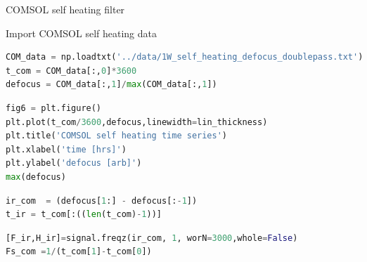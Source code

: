 
\noindent COMSOL self heating filter

\noindent Import COMSOL self heating data

\begin{spacing}{1.2} \begin{lstlisting}[frame=single,language=Python]
COM_data = np.loadtxt('../data/1W_self_heating_defocus_doublepass.txt')
t_com = COM_data[:,0]*3600
defocus = COM_data[:,1]/max(COM_data[:,1])
\end{lstlisting} \end{spacing}

\begin{spacing}{1.2} \begin{lstlisting}[frame=single,language=Python]
fig6 = plt.figure()
plt.plot(t_com/3600,defocus,linewidth=lin_thickness)
plt.title('COMSOL self heating time series')
plt.xlabel('time [hrs]')
plt.ylabel('defocus [arb]')
max(defocus)
\end{lstlisting} \end{spacing}


\begin{spacing}{1.2} \begin{lstlisting}[frame=single,language=Python]
ir_com  = (defocus[1:] - defocus[:-1])
t_ir = t_com[:((len(t_com)-1))]
\end{lstlisting} \end{spacing}

\begin{spacing}{1.2} \begin{lstlisting}[frame=single,language=Python]
[F_ir,H_ir]=signal.freqz(ir_com, 1, worN=3000,whole=False) 
Fs_com =1/(t_com[1]-t_com[0])
\end{lstlisting} \end{spacing}

